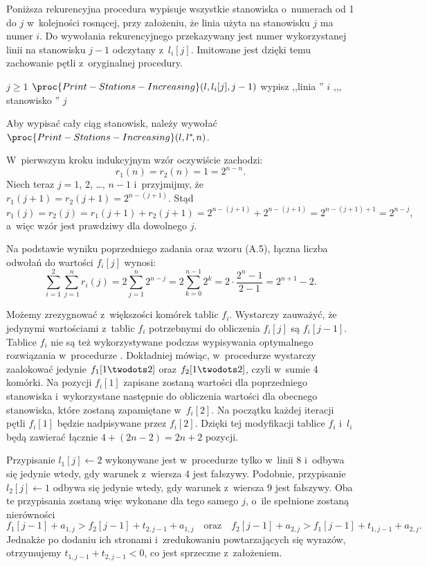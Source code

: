 
\exercise %
Poniższa rekurencyjna procedura wypisuje wszystkie stanowiska o~numerach od 1 do $j$ w~kolejności rosnącej, przy założeniu, że linia użyta na stanowisku $j$ ma numer $i$.
Do wywołania rekurencyjnego przekazywany jest numer wykorzystanej linii na stanowisku $j-1$ odczytany z~$l_i[j]$.
Imitowane jest dzięki temu zachowanie pętli z~oryginalnej procedury.
\begin{codebox}
\li	\If $j\ge1$
\li	\Then $\proc{Print-Stations-Increasing}(l,l_i[j],j-1)$
\li		wypisz ,,linia '' $i$ ,,{}, stanowisko '' $j$
	\End
\end{codebox}
Aby wypisać cały ciąg stanowisk, należy wywołać $\proc{Print-Stations-Increasing}(l,l^*\!,n)$.

\exercise %
W~pierwszym kroku indukcyjnym wzór oczywiście zachodzi:
\[
	r_1(n) = r_2(n) = 1 = 2^{n-n}.
\]
Niech teraz $j=1$, 2, \dots, $n-1$ i~przyjmijmy, że $r_1(j+1)=r_2(j+1)=2^{n-(j+1)}$.
Stąd
\[
	r_1(j) = r_2(j) = r_1(j+1)+r_2(j+1) = 2^{n-(j+1)}+2^{n-(j+1)} = 2^{n-(j+1)+1} = 2^{n-j},
\]
a~więc wzór jest prawdziwy dla dowolnego $j$.

\exercise %
Na podstawie wyniku poprzedniego zadania oraz wzoru (A.5), łączna liczba odwołań do wartości $f_i[j]$ wynosi:
\[
	\sum_{i=1}^2\sum_{j=1}^nr_i(j) = 2\sum_{j=1}^n2^{n-j} = 2\sum_{k=0}^{n-1}2^k = 2\cdot\frac{2^n-1}{2-1} = 2^{n+1}-2.
\]

\exercise %
Możemy zrezygnować z~większości komórek tablic $f_i$.
Wystarczy zauważyć, że jedynymi wartościami z~tablic $f_i$ potrzebnymi do obliczenia $f_i[j]$ są $f_i[j-1]$.
Tablice $f_i$ nie są też wykorzystywane podczas wypisywania optymalnego rozwiązania w~procedurze .
Dokładniej mówiąc, w~procedurze  wystarczy zaalokować jedynie $f_1[1\twodots2]$ oraz $f_2[1\twodots2]$, czyli w~sumie 4 komórki.
Na pozycji $f_i[1]$ zapisane zostaną wartości dla poprzedniego stanowiska i~wykorzystane następnie do obliczenia wartości dla obecnego stanowiska, które zostaną zapamiętane w~$f_i[2]$.
Na początku każdej iteracji pętli  $f_i[1]$ będzie nadpisywane przez $f_i[2]$.
Dzięki tej modyfikacji tablice $f_i$ i~$l_i$ będą zawierać łącznie $4+(2n-2)=2n+2$ pozycji.

\exercise %
Przypisanie $l_1[j]\gets2$ wykonywane jest w~procedurze  tylko w~linii 8 i~odbywa się jedynie wtedy, gdy warunek z~wiersza 4 jest fałszywy.
Podobnie, przypisanie $l_2[j]\gets1$ odbywa się jedynie wtedy, gdy warunek z~wiersza 9 jest fałszywy.
Oba te przypisania zostaną więc wykonane dla tego samego $j$, o~ile spełnione zostaną nierówności
\[
	f_1[j-1]+a_{1,j}>f_2[j-1]+t_{2,j-1}+a_{1,j} \quad\text{oraz}\quad f_2[j-1]+a_{2,j}>f_1[j-1]+t_{1,j-1}+a_{2,j}.
\]
Jednakże po dodaniu ich stronami i~zredukowaniu powtarzających się wyrazów, otrzymujemy $t_{1,j-1}+t_{2,j-1}<0$, co jest sprzeczne z~założeniem.
